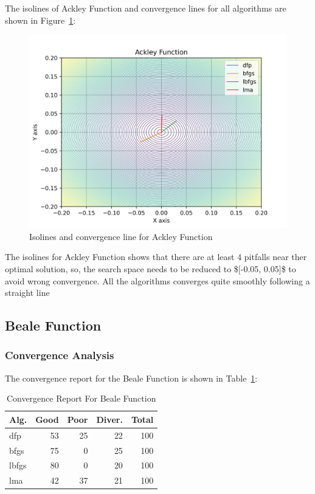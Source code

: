 \documentclass[conference]{IEEEtran}
\begin{document}
The isolines of Ackley Function and convergence lines for all algorithms are shown in Figure~\ref{fig:ackley}:\begin{figure}[H]
\centering
\caption{Isolines and convergence line for Ackley Function}
\label{fig:ackley}
\includegraphics[scale=0.5]{images/ackley.jpg}
\end{figure}
The isolines for Ackley Function shows that there are at least 4 pitfalls near ther optimal solution, so, the search space needs to be reduced to \$[-0.05, 0.05]\$ to avoid wrong convergence. All the algorithms converges quite smoothly following a straight line\subsection{Beale Function}
\label{beale2D}

\subsubsection{Convergence Analysis}
\label{convergencebeale2D}


The convergence report for the Beale Function is shown in Table~\ref{convergence:beale}:

\begin{table}[H]
\centering
\caption{Convergence Report For Beale Function}
\label{convergence:beale}
\begin{tabular}{lrrrr}
\toprule
 Alg. &  Good &  Poor &  Diver. &  Total \\
\midrule
  dfp &    53 &    25 &      22 &    100 \\
 bfgs &    75 &     0 &      25 &    100 \\
lbfgs &    80 &     0 &      20 &    100 \\
  lma &    42 &    37 &      21 &    100 \\
\bottomrule
\end{tabular}
\end{table}
\end{document}
